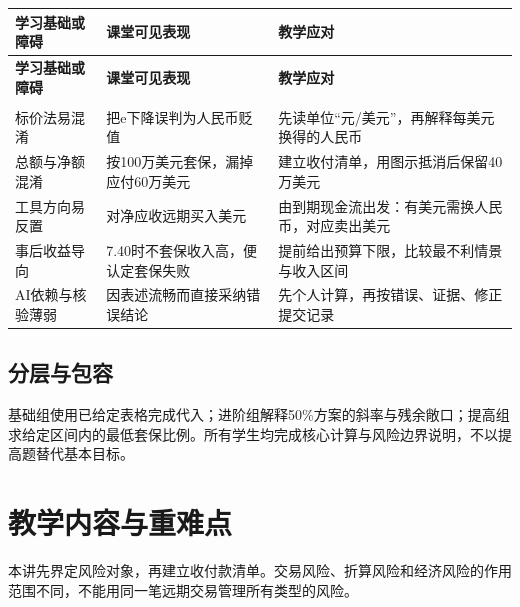 \documentclass[lang=cn,11pt,oneside,openany,chinesefont=nofont,color=blue,titlestyle=hang]{elegantbook}
\begin{document}
\begingroup\small{}\setlength{\tabcolsep}{6pt}\renewcommand{\arraystretch}{1.24}
\begin{longtable}{>{\raggedright\arraybackslash}p{}>{\raggedright\arraybackslash}p{}>{\raggedright\arraybackslash}p{}}
\toprule[.8pt]\rowcolor{Navy}
\color{white}\bfseries 学习基础或障碍 & \color{white}\bfseries 课堂可见表现 & \color{white}\bfseries 教学应对 \\
\midrule\endfirsthead
\toprule[.8pt]\rowcolor{Navy}
\color{white}\bfseries 学习基础或障碍 & \color{white}\bfseries 课堂可见表现 & \color{white}\bfseries 教学应对 \\
\midrule\endhead
\midrule\multicolumn{3}{r}{\footnotesize\color{Muted}续下页}\\\endfoot
\bottomrule[.8pt]\endlastfoot
标价法易混淆 & 把e下降误判为人民币贬值 & 先读单位“元/美元”，再解释每美元换得的人民币 \\
\midrule[.25pt]
\rowcolor{Pale}
总额与净额混淆 & 按100万美元套保，漏掉应付60万美元 & 建立收付清单，用图示抵消后保留40万美元 \\
\midrule[.25pt]
工具方向易反置 & 对净应收远期买入美元 & 由到期现金流出发：有美元需换人民币，对应卖出美元 \\
\midrule[.25pt]
\rowcolor{Pale}
事后收益导向 & 7.40时不套保收入高，便认定套保失败 & 提前给出预算下限，比较最不利情景与收入区间 \\
\midrule[.25pt]
AI依赖与核验薄弱 & 因表述流畅而直接采纳错误结论 & 先个人计算，再按错误、证据、修正提交记录 \\
\midrule[.25pt]
\end{longtable}\endgroup

\subsection*{分层与包容}

基础组使用已给定表格完成代入；进阶组解释50\%方案的斜率与残余敞口；提高组求给定区间内的最低套保比例。所有学生均完成核心计算与风险边界说明，不以提高题替代基本目标。

\clearpage

\section{教学内容与重难点}\label{sec:g5}

本讲先界定风险对象，再建立收付款清单。交易风险、折算风险和经济风险的作用范围不同，不能用同一笔远期交易管理所有类型的风险。
\end{document}
